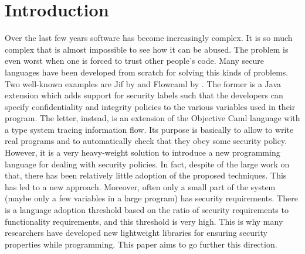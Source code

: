 \section{Introduction}
Over the last few years software has become increasingly complex. It is so much complex that is almost impossible to see how it can be abused. The problem is even worst when one is forced to trust other people's code. Many secure languages have been developed from scratch for solving this kinds of problems. Two well-known examples are Jif \cite{pullicino2014jif} by \citeauthor{pullicino2014jif} and Flowcaml \cite{simonet2003flow} by \citeauthor{simonet2003flow}. The former is a Java extension which adds support for security labels such that the developers can specify confidentiality and integrity policies to the various variables used in their program. The letter, instead, is an extension of the Objective Caml language with a type system tracing information flow. Its purpose is basically to allow to write real programs and to automatically check that they obey some security policy. \\
However, it is a very heavy-weight solution to introduce a new programming language for dealing with security policies. In fact, despite of the large work on that, there has been relatively little adoption of the proposed techniques. This has led to a new approach. Moreover, often only a small part of the system (maybe only a few variables in a large program) has security requirements. There is a language adoption threshold based on the ratio of security requirements to functionality requirements, and this threshold is very high. This is why many researchers have developed new lightweight libraries for ensuring security properties while programming. This paper aims to go further this direction. \\
